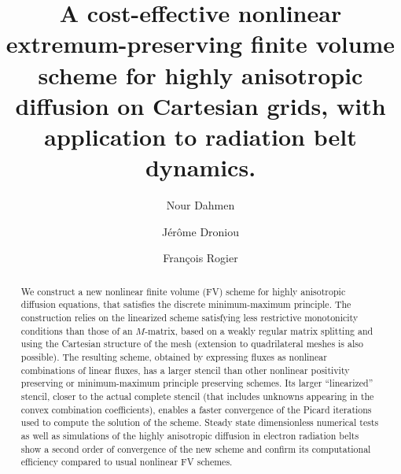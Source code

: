 \documentclass[final,11pt]{elsarticle}
\begin{document}
\begin{frontmatter}




\title{A cost-effective nonlinear extremum-preserving finite volume scheme for highly anisotropic diffusion on Cartesian grids, with application to radiation belt dynamics.}




\author[a]{Nour Dahmen}
\author[b]{J\'er\^ome Droniou}
\author[c]{François Rogier}

\address[a]{ONERA/DPHY, Université de Toulouse, Toulouse, France}
\address[b]{School of Mathematics, Monash University, Clayton, Australia}
\address[c]{ONERA/DTIS, Université de Toulouse, Toulouse, France}


\begin{abstract}
We construct a new nonlinear finite volume (FV) scheme for highly anisotropic diffusion equations, that satisfies the discrete minimum-maximum principle. The construction relies on the linearized scheme satisfying less restrictive monotonicity conditions than those of an $M$-matrix, based on a weakly regular matrix splitting and using the Cartesian structure of the mesh (extension to quadrilateral meshes is also possible). The resulting scheme, obtained by expressing fluxes as nonlinear combinations of linear fluxes, has a larger stencil than other nonlinear positivity preserving or minimum-maximum principle preserving schemes. Its larger ``linearized'' stencil, closer to the actual complete stencil (that includes unknowns appearing in the convex combination coefficients), enables a faster convergence of the Picard iterations used to compute the solution of the scheme. Steady state dimensionless numerical tests as well as simulations of the highly anisotropic diffusion in electron radiation belts show a second order of convergence of the new scheme and confirm its computational efficiency compared to usual nonlinear FV schemes.
\end{abstract}


\end{frontmatter}
\end{document}
